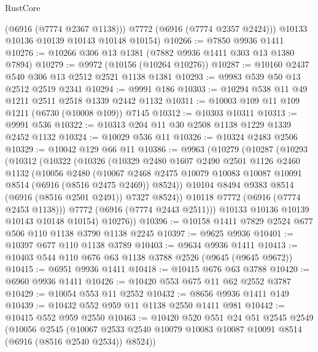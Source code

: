 \begin{lexlean}{RustCore}
\begin{coremodule}
          (@6916 (@7774 @2367 @1138)))
        @7772
        (@6916 (@7774 @2357 @2424)))
      @10133
      @10136
      @10139
      @10143
      @10148
      @10154)
@10266 := @7850 @9936 @1411
@10276 := @10266 @306 @13 @1381 (@7882 @9936 @1411 @303 @13 @1380 @7894)
@10279 := @9972 (@10156 (@10264 @10276))
@10287 := @10160 @2437 @540 @306 @13 @2512 @2521 @1138 @1381
@10293 := @9983 @539 @50 @13 @2512 @2519 @2341
@10294 := @9991 @186
@10303 := @10294 @538 @11 @49 @1211 @2511 @2518 @1339 @2442 @1132
@10311 := @10003 @109 @11 @109 @1211 (@6730 (@10008 @109)) @7145
@10312 := @10303 @10311
@10313 := @9991 @536
@10322 := @10313 @204 @11 @30 @2508 @1138 @1229 @1339 @2452 @1132
@10324 := @10029 @536 @11
@10326 := @10324 @2483 @2506
@10329 := @10042 @129 @66 @11
@10386 := @9963
    (@10279
      (@10287
        (@10293
          (@10312
            (@10322
              (@10326
                (@10329
                  @2480
                  @1607
                  @2490
                  @2501
                  @1126
                  @2460
                  @1132
                  (@10056
                    @2480
                    (@10067
                      @2468
                      @2475
                      @10079
                      @10083
                      @10087
                      @10091
                      @8514
                      (@6916 (@8516 @2475 @2469))
                      @8524))
                  @10104
                  @8494
                  @9383
                  @8514
                  (@6916 (@8516 @2501 @2491))
                  @7327
                  @8524))
              @10118
              @7772
              (@6916 (@7774 @2453 @1138)))
            @7772
            (@6916 (@7774 @2443 @2511)))
          @10133
          @10136
          @10139
          @10143
          @10148
          @10154)
        @10276))
@10396 := @10158 @1411 @7829 @2524 @677 @506 @110 @1138 @3790 @1138 @2245
@10397 := @9625 @9936
@10401 := @10397 @677 @110 @1138 @3789
@10403 := @9634 @9936 @1411
@10413 := @10403 @544 @110 @676 @63 @1138 @3788 @2526 (@9645 (@9645 @9672))
@10415 := @6951 @9936 @1411
@10418 := @10415 @676 @63 @3788
@10420 := @6960 @9936 @1411
@10426 := @10420 @553 @675 @11 @62 @2552 @3787
@10429 := @10054 @553 @11 @2552
@10432 := @8656 @9936 @1411 @149
@10439 := @10432 @552 @959 @11 @1138 @2550 @1411 @981
@10442 := @10415 @552 @959 @2550
@10463 := @10420
    @520
    @551
    @24
    @51
    @2545
    @2549
    (@10056
      @2545
      (@10067 @2533 @2540 @10079 @10083 @10087 @10091 @8514 (@6916 (@8516 @2540 @2534)) @8524))

\end{coremodule}
\end{lexlean}
